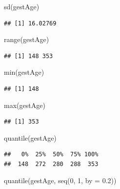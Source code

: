 \documentclass[
]{book}
\newenvironment{Shaded}{\begin{snugshade}}{\end{snugshade}}
\newcommand{\AttributeTok}[1]{\textcolor[rgb]{0.77,0.63,0.00}{#1}}
\newcommand{\DecValTok}[1]{\textcolor[rgb]{0.00,0.00,0.81}{#1}}
\newcommand{\FloatTok}[1]{\textcolor[rgb]{0.00,0.00,0.81}{#1}}
\newcommand{\FunctionTok}[1]{\textcolor[rgb]{0.00,0.00,0.00}{#1}}
\newcommand{\NormalTok}[1]{#1}
\begin{document}
\begin{Shaded}
\begin{Highlighting}[]
\FunctionTok{sd}\NormalTok{(gestAge)}
\end{Highlighting}
\end{Shaded}

\begin{verbatim}
## [1] 16.02769
\end{verbatim}

\begin{Shaded}
\begin{Highlighting}[]
\FunctionTok{range}\NormalTok{(gestAge)}
\end{Highlighting}
\end{Shaded}

\begin{verbatim}
## [1] 148 353
\end{verbatim}

\begin{Shaded}
\begin{Highlighting}[]
\FunctionTok{min}\NormalTok{(gestAge)}
\end{Highlighting}
\end{Shaded}

\begin{verbatim}
## [1] 148
\end{verbatim}

\begin{Shaded}
\begin{Highlighting}[]
\FunctionTok{max}\NormalTok{(gestAge)}
\end{Highlighting}
\end{Shaded}

\begin{verbatim}
## [1] 353
\end{verbatim}

\begin{Shaded}
\begin{Highlighting}[]
\FunctionTok{quantile}\NormalTok{(gestAge)}
\end{Highlighting}
\end{Shaded}

\begin{verbatim}
##   0%  25%  50%  75% 100% 
##  148  272  280  288  353
\end{verbatim}

\begin{Shaded}
\begin{Highlighting}[]
\FunctionTok{quantile}\NormalTok{(gestAge, }\FunctionTok{seq}\NormalTok{(}\DecValTok{0}\NormalTok{, }\DecValTok{1}\NormalTok{, }\AttributeTok{by =} \FloatTok{0.2}\NormalTok{))}
\end{Highlighting}
\end{Shaded}
\end{document}
